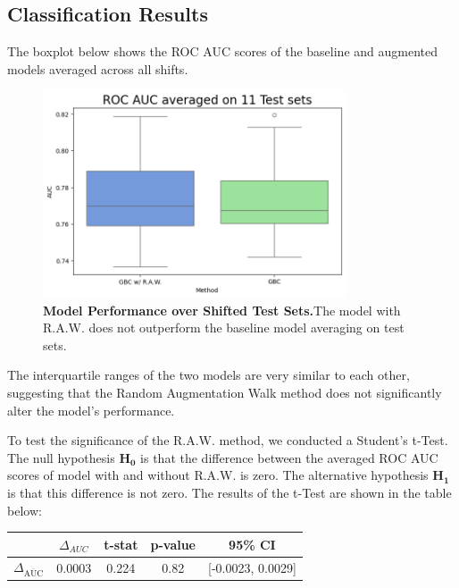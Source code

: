 \subsection{Classification Results}


The boxplot below shows the ROC AUC scores of the baseline and augmented models averaged across all shifts.

\begin{figure}[H]
    \centering
    \includegraphics[width=0.8\textwidth]{assets/RealRaw11.png} 
    \caption{\textbf{Model Performance over Shifted Test Sets.}The model with R.A.W. does not outperform the baseline model averaging on test sets.}
\end{figure}

The interquartile ranges of the two models are very similar to each other, suggesting that the Random Augmentation Walk method does not significantly alter the model's performance.


To test the significance of the R.A.W. method, we conducted a Student's t-Test. The null hypothesis $\boldsymbol{H_0}$ is that the difference between the averaged ROC AUC scores of model with and without R.A.W. is zero. The alternative hypothesis $\boldsymbol{H_1}$ is that this difference is not zero. The results of the t-Test are shown in the table below:

\begin{table}[H]
    \centering
    \begin{tabular}{lcccc}
        \toprule
        & $\Delta_{AUC}$ & t-stat & p-value & 95\% CI \\
        \midrule
        $\Delta_{\overline{\text{AUC}}}$ & 0.0003 & 0.224  & 0.82 & [-0.0023, 0.0029] \\
        \bottomrule
    \end{tabular}
\end{table}

